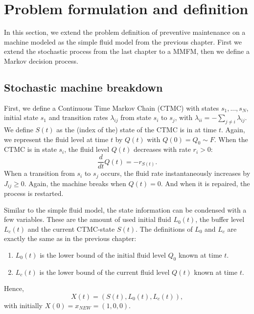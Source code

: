 \section{Problem formulation and definition}
In this section, we extend the problem definition of preventive maintenance on a machine modeled as the simple fluid model from the previous chapter.
First we extend the stochastic process from the last chapter to a MMFM, then we define a Markov decision process.

\subsection{Stochastic machine breakdown}
First, we define a Continuous Time Markov Chain (CTMC) with states $s_1,...,s_N$, initial state $s_1$ and transition rates $\lambda_{ij}$ from state $s_i$ to $s_j$, with $\lambda_{ii}=-\sum_{j\neq i}\lambda_{ij}$.
We define $S(t)$ as the (index of the) state of the CTMC is in at time $t$.
Again, we represent the fluid level at time $t$ by $Q(t)$ with $Q(0)=Q_0\sim F$.
When the CTMC is in state $s_i$, the fluid level $Q(t)$ decreases with rate $r_i>0$:
\[
\frac{d}{dt}Q(t)=-r_{S(t)}.
\]
When a transition from $s_i$ to $s_j$ occurs, the fluid rate instantaneously increases by $J_{ij}\geq 0$.
Again, the machine breaks when $Q(t)=0$.
And when it is repaired, the process is restarted.

Similar to the simple fluid model, the state information can be condensed with a few variables.
These are the amount of used initial fluid $L_0(t)$, the buffer level $L_c(t)$ and the current CTMC-state $S(t)$.
The definitions of $L_0$ and $L_c$ are exactly the same as in the previous chapter:
\begin{enumerate}
	\item $L_0(t)$ is the lower bound of the initial fluid level $Q_0$ known at time $t$.
	\item $L_c(t)$ is the lower bound of the current fluid level $Q(t)$ known at time $t$.
\end{enumerate}
Hence,
\[
X(t)=(S(t),L_0(t),L_c(t)),
\]
with initially $X(0)=x_{NEW}=(1,0,0)$.

